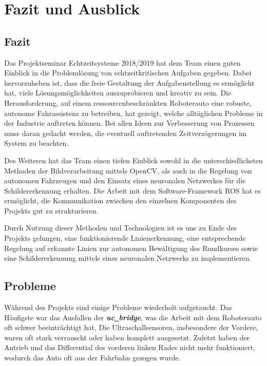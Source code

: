 \section{Fazit und Ausblick}
\label{sec:fazit}

\subsection{Fazit}
Das Projektseminar Echtzeitsysteme 2018/2019 hat dem Team einen guten Einblick in die Probleml\"osung von echtzeitkritischen Aufgaben gegeben. Dabei hervorzuheben ist, dass die freie Gestaltung der Aufgabenstellung es erm\"oglicht hat, viele L\"osungsm\"oglichkeiten auszuprobieren und kreativ zu sein. Die Herausforderung, auf einem ressourcenbeschr\"ankten Roboterauto eine robuste, autonome Fahrassistenz zu betreiben, hat gezeigt, welche allt\"aglichen Probleme in der Industrie auftreten k\"onnen. Bei allen Ideen zur Verbesserung von Prozessen muss daran gedacht werden, die eventuell auftretenden Zeitverz\"ogerungen im System zu beachten.

Des Weiteren hat das Team einen tiefen Einblick sowohl in die unterschiedlichsten Methoden der Bildverarbeitung mittels OpenCV, als auch in die Regelung von autonomen Fahrzeugen und den Einsatz eines neuronalen Netzwerkes f\"ur die Schildererkennung erhalten. Die Arbeit mit dem Software-Framework ROS\cite{ROS} hat es erm\"oglicht, die Kommunikation zwischen den einzelnen Komponenten des Projekts gut zu strukturieren.

Durch Nutzung dieser Methoden und Technologien ist es uns zu Ende des Projekts gelungen,
eine funktionierende Linienerkennung, eine entsprechende Regelung
auf erkannte Linien zur autonomen Bew\"altigung des Rundkurses sowie eine Schildererkennung
mittels eines neuronalen Netzwerks zu implementieren.

\subsection{Probleme}
W\"ahrend des Projekts sind einige Probleme wiederholt aufgetaucht. Das H\"aufigste war das Ausfallen der \textbf{\textit{uc\underline{\ }bridge}}, was die Arbeit mit dem Roboterauto oft schwer beeintr\"achtigt hat. Die Ultraschallsensoren, insbesondere der Vordere, waren oft stark verrauscht oder haben komplett ausgesetzt. Zuletzt haben der Antrieb und das Differential des vorderen linken Rades nicht mehr funktioniert, wodurch das Auto oft aus der Fahrbahn gezogen wurde.

